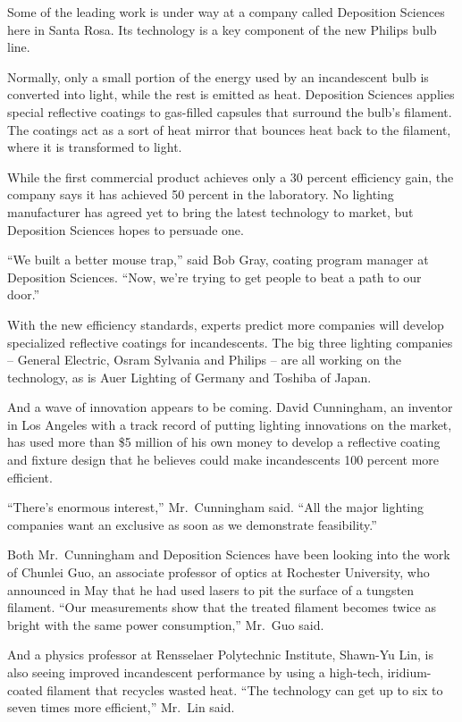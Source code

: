 ﻿\documentclass[12pt]{article}
\begin{document}
Some of the leading work is under way at a company called Deposition Sciences here in Santa Rosa.
Its technology is a key component of the new Philips bulb line.

Normally, only a small portion of the energy used by an incandescent bulb is converted into light,
while the rest is emitted as heat. Deposition Sciences applies special reflective coatings to
gas-filled capsules that surround the bulb's filament. The coatings act as a sort of heat mirror
that bounces heat back to the filament, where it is transformed to light.

While the first commercial product achieves only a 30 percent efficiency gain, the company says it
has achieved 50 percent in the laboratory. No lighting manufacturer has agreed yet to bring the
latest technology to market, but Deposition Sciences hopes to persuade one.

``We built a better mouse trap,'' said Bob Gray, coating program manager at Deposition Sciences.
``Now, we're trying to get people to beat a path to our door.''

With the new efficiency standards, experts predict more companies will develop specialized
reflective coatings for incandescents. The big three lighting companies -- General Electric, Osram
Sylvania and Philips -- are all working on the technology, as is Auer Lighting of Germany and
Toshiba of Japan.

And a wave of innovation appears to be coming. David Cunningham, an inventor in Los Angeles with a
track record of putting lighting innovations on the market, has used more than \$5 million of his
own money to develop a reflective coating and fixture design that he believes could make
incandescents 100 percent more efficient.

``There's enormous interest,'' Mr.~Cunningham said. ``All the major lighting companies want an
exclusive as soon as we demonstrate feasibility.''

Both Mr.~Cunningham and Deposition Sciences have been looking into the work of Chunlei Guo, an
associate professor of optics at Rochester University, who announced in May that he had used lasers
to pit the surface of a tungsten filament. ``Our measurements show that the treated filament becomes
twice as bright with the same power consumption,'' Mr.~Guo said.

And a physics professor at Rensselaer Polytechnic Institute, Shawn-Yu Lin, is also seeing improved
incandescent performance by using a high-tech, iridium-coated filament that recycles wasted heat.
``The technology can get up to six to seven times more efficient,'' Mr.~Lin said.
\end{document}
